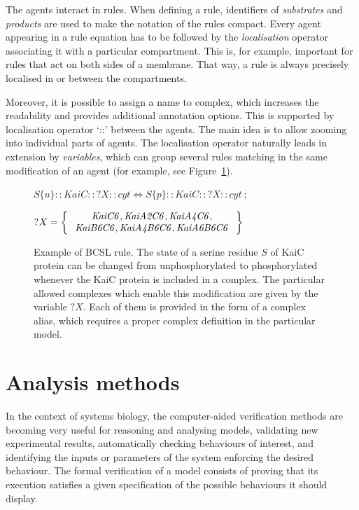 \documentclass[11pt,a4paper]{report}
\begin{document}
The agents interact in rules. When defining a rule, identifiers of \emph{substrates} and \emph{products} are used to make the notation of the rules compact. Every agent appearing in a rule equation has to be followed by the \emph{localisation} operator associating it with a particular compartment. This is, for example, important for rules that act on both sides of a membrane. That way, a rule is always precisely localised in or between the compartments.

Moreover, it is possible to assign a name to complex, which increases the readability and provides additional annotation options. This is supported by localisation operator `{::}' between the agents. The main idea is to allow zooming into individual parts of agents. The localisation operator naturally leads in extension by \emph{variables}, which can group several rules matching in the same modification of an agent (for example, see Figure~\ref{BCSL_rule}).

\begin{figure}
	\begin{center}
		$ S\{u\}{::}KaiC{::}?X{::}cyt \Leftrightarrow S\{p\}{::}KaiC{::}?X{::}cyt ~;~$
		
		$ ?X = \Set{
			\begin{array}{c}
			\mathit{KaiC6}, \mathit{KaiA2C6}, \mathit{KaiA4C6},\\
			\mathit{KaiB6C6}, \mathit{KaiA4B6C6}, \mathit{KaiA6B6C6}
			\end{array}
		}$
	\end{center}
	\caption{Example of BCSL rule. The state of a serine residue $S$ of KaiC protein can be changed from unphosphorylated to phosphorylated whenever the KaiC protein is included in a complex. The particular allowed complexes which enable this modification are given by the variable $?X$. Each of them is provided in the form of a complex alias, which requires a proper complex definition in the particular model.}
	\label{BCSL_rule}
\end{figure}

\section{Analysis methods}\label{analysis_sec}

In the context of systems biology, the computer-aided verification methods are becoming very useful for reasoning and analysing models, validating new experimental results, automatically checking behaviours of interest, and identifying the inputs or parameters of the system enforcing the desired behaviour. The formal verification of a model consists of proving that its execution satisfies a given specification of the possible behaviours it should display.
\end{document}

